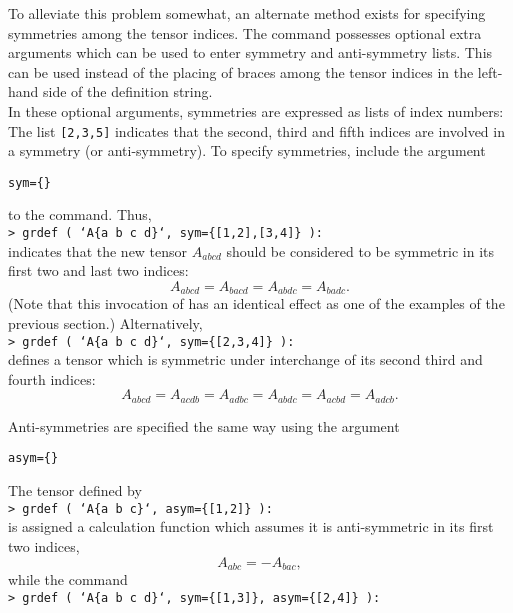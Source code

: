 \documentclass{article}
\begin{document}
To alleviate this problem somewhat, an alternate method exists for
specifying symmetries among the tensor indices. The 
command possesses optional extra arguments which can be used to enter
symmetry and anti-symmetry lists. This can be used instead of the
placing of braces among the tensor indices in the left-hand side of
the definition string.\\

In these optional arguments, symmetries are expressed as lists of
index numbers: The list \texttt{[2,3,5]} indicates that the second,
third and fifth indices are involved in a symmetry (or
anti-symmetry). To specify symmetries, include the argument
\begin{center}
  \texttt{sym=\{\}}
\end{center}
to the  command. Thus,\\

\noindent\texttt{> grdef ( `A\{a b c d\}`, sym=\{[1,2],[3,4]\} ):} \\

\noindent indicates that the new tensor $A_{abcd}$ should be considered
to be symmetric in its first two and last two indices:
\[
  A_{abcd} = A_{bacd} = A_{abdc} = A_{badc}.
\]
(Note that this invocation of  has an identical effect as
one of the examples of the previous section.) Alternatively,\\

\noindent\texttt{> grdef ( `A\{a b c d\}`, sym=\{[2,3,4]\} ):}\\

\noindent defines a tensor which is symmetric under interchange of its
second third and fourth indices:
\[
  A_{abcd} = A_{acdb} = A_{adbc} = A_{abdc} = A_{acbd} = A_{adcb}.
\]

Anti-symmetries are specified the same way using the argument
\begin{center}
  \texttt{asym=\{\} }
\end{center}
The tensor defined
by\\

\noindent\texttt{> grdef ( `A\{a b c\}`, asym=\{[1,2]\} ):}\\

\noindent is assigned a calculation function which assumes it is
anti-symmetric in its first two indices,
\[
  A_{abc} = -A_{bac},
\]
while the command\\

\noindent\texttt{> grdef ( `A\{a b c d\}`, sym=\{[1,3]\}, 
asym=\{[2,4]\} ):}\\
\end{document}
